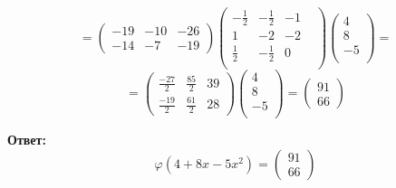 \documentclass[a4paper,12pt]{article}
\begin{document}
\[
=
\left(\begin{matrix}
-19 & -10 & -26 \\
-14 & -7 & -19
\end{matrix}\right)
\begin{pmatrix}
-\frac{1}{2} & -\frac{1}{2} & -1 & \\
1 & -2 & -2 & \\
\frac{1}{2} & -\frac{1}{2}& 0 & \\
\end{pmatrix}
\begin{pmatrix}
4 \\
8 \\
-5\\
\end{pmatrix} = 
\]
\[
= 
\left(\begin{matrix}
\frac{-27}{2} & \frac{85}{2} & 39 \\
\frac{-19}{2} & \frac{61}{2} & 28
\end{matrix}\right)
\begin{pmatrix}
4 \\
8 \\
-5\\
\end{pmatrix}
= \left(\begin{matrix}
91 \\
66
\end{matrix}\right)
\]
{\LARGE \begin{center}
\textbf{Ответ: } 
\[
\varphi(4+8x-5x^2)  = \left(\begin{matrix}
91 \\
66
\end{matrix}\right)
\]
\end{center}}
\end{document}
